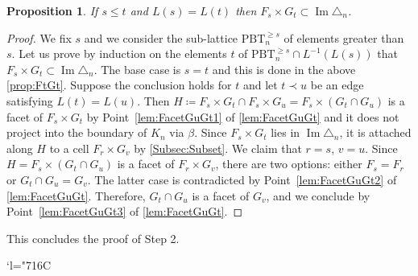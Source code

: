 \documentclass[11pt]{article}
\numberwithin{equation}{section}\providecommand{\No}{}
\newcommand{\Changelback}{\mathcode`l="716C}
\theoremstyle{plain}
\newtheorem{proposition}{Proposition}
\theoremstyle{definition}
\newcommand{\K}{{K}}
\newcommand{\Tam}[1]{\mathrm{PBT}_{#1}}
\DeclareMathOperator{\im}{\mathrm{Im}}
\begin{document}
\begin{proposition}
If $s\leq t$ and $L(s) = L(t)$ then $F_s\times G_t\subset \im\triangle_n$.
\end{proposition}

\begin{proof}
We fix $s$ and we consider the sub-lattice $\Tam{n}^{\geq s}$ of elements greater than~$s$.
Let us prove by induction on the elements $t$ of $\Tam{n}^{\geq s}\cap L^{-1}(L(s))$ that
$F_s\times G_t\subset \im\triangle_n$.
The base case is $s=t$ and this is done in the above \cref{prop:FtGt}.
Suppose the conclusion holds for $t$ and let $t\prec u$ be an edge satisfying $L(t)= L(u)$.
Then $H \coloneqq F_s\times G_t\cap F_s\times G_u = F_s\times (G_t\cap G_u)$ is a facet of $F_s\times G_t$
by Point~\eqref{lem:FacetGuGt1} of \cref{lem:FacetGuGt} and it does not project into the boundary of $\K_n$ via $\beta$.
Since $F_s\times G_t$ lies in $\im\triangle_n$, it is attached along $H$ to a cell
$F_r\times G_v$ by \cref{Subsec:Subset}.
We claim that $r=s$, $v=u$.
Since $H=F_s\times (G_t\cap G_u)$ is a facet of $F_r\times G_v$, there are two options: either $F_s=F_r$ or $G_t\cap G_u=G_v$. The latter case is contradicted by Point~\eqref{lem:FacetGuGt2} of \cref{lem:FacetGuGt}.
Therefore, $G_t\cap G_u$ is a facet of $G_v$, and we conclude by
Point~\eqref{lem:FacetGuGt3} of \cref{lem:FacetGuGt}.
\end{proof}

This concludes the proof of Step 2.

\Changelback

\end{document}
